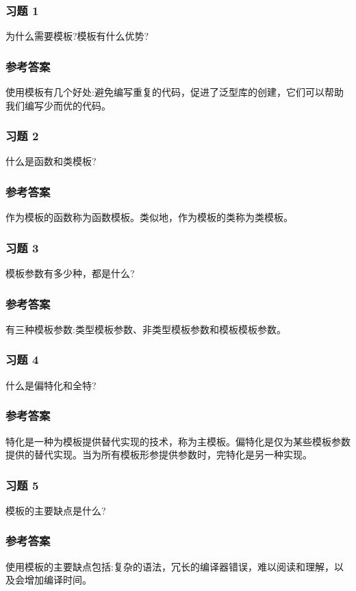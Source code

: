 
\subsubsection{习题 1}

为什么需要模板?模板有什么优势?

\subsubsection{参考答案}

使用模板有几个好处:避免编写重复的代码，促进了泛型库的创建，它们可以帮助我们编写少而优的代码。

\subsubsection{习题 2}

什么是函数和类模板?

\subsubsection{参考答案}

作为模板的函数称为函数模板。类似地，作为模板的类称为类模板。

\subsubsection{习题 3}

模板参数有多少种，都是什么?

\subsubsection{参考答案}

有三种模板参数:类型模板参数、非类型模板参数和模板模板参数。

\subsubsection{习题 4}

什么是偏特化和全特?

\subsubsection{参考答案}

特化是一种为模板提供替代实现的技术，称为主模板。偏特化是仅为某些模板参数提供的替代实现。当为所有模板形参提供参数时，完特化是另一种实现。

\subsubsection{习题 5}

模板的主要缺点是什么?

\subsubsection{参考答案}

使用模板的主要缺点包括:复杂的语法，冗长的编译器错误，难以阅读和理解，以及会增加编译时间。




